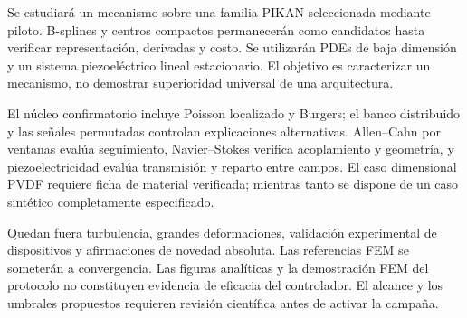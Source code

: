 \label{sec:alcance}
Se estudiará un mecanismo sobre una familia PIKAN seleccionada mediante piloto. B-splines y centros compactos permanecerán como candidatos hasta verificar representación, derivadas y costo. Se utilizarán PDEs de baja dimensión y un sistema piezoeléctrico lineal estacionario. El objetivo es caracterizar un mecanismo, no demostrar superioridad universal de una arquitectura.

El núcleo confirmatorio incluye Poisson localizado y Burgers; el banco distribuido y las señales permutadas controlan explicaciones alternativas. Allen--Cahn por ventanas evalúa seguimiento, Navier--Stokes verifica acoplamiento y geometría, y piezoelectricidad evalúa transmisión y reparto entre campos. El caso dimensional PVDF requiere ficha de material verificada; mientras tanto se dispone de un caso sintético completamente especificado.

Quedan fuera turbulencia, grandes deformaciones, validación experimental de dispositivos y afirmaciones de novedad absoluta. Las referencias FEM se someterán a convergencia. Las figuras analíticas y la demostración FEM del protocolo no constituyen evidencia de eficacia del controlador. El alcance y los umbrales propuestos requieren revisión científica antes de activar la campaña.

